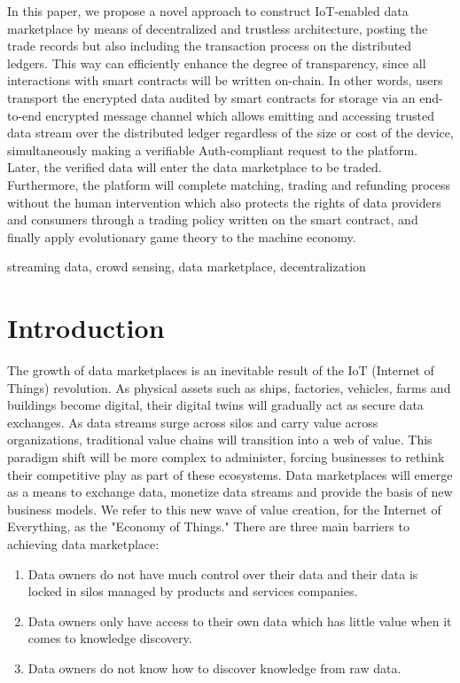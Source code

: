 \documentclass[journal,10pt,a4paper]{IEEEtran}
\begin{document}
In this paper, we propose a novel approach to construct IoT-enabled data marketplace by means of decentralized and trustless architecture, posting the trade records but also including the transaction process on the distributed ledgers. This way can efficiently enhance the degree of transparency, since all interactions with smart contracts will be written on-chain. In other words, users transport the encrypted data audited by smart contracts for storage via an end-to-end encrypted message channel which allows emitting and accessing trusted data stream over the distributed ledger regardless of the size or cost of the device, simultaneously making a verifiable Auth-compliant request to the platform. Later, the verified data will enter the data marketplace to be traded. Furthermore, the platform will complete matching, trading and refunding process without the human intervention which also protects the rights of data providers and consumers through a trading policy written on the smart contract, and finally apply evolutionary game theory to the machine economy.

\begin{IEEEkeywords}
    streaming data, crowd sensing, data marketplace, decentralization
\end{IEEEkeywords}

\section{\normalsize\textbf{Introduction}}
The growth of data marketplaces is an inevitable result of the IoT (Internet of Things) revolution. As physical assets such as ships, factories, vehicles, farms and buildings become digital, their digital twins will gradually act as secure data exchanges.\cite{digitaltwin}\cite{AutonomousDriving} As data streams surge across silos and carry value across organizations, traditional value chains will transition into a web of value. This paradigm shift will be more complex to administer, forcing businesses to rethink their competitive play as part of these ecosystems. Data marketplaces will emerge as a means to exchange data, monetize data streams and provide the basis of new business models. We refer to this new wave of value creation, for the Internet of Everything, as the "Economy of Things." There are three main barriers to achieving data marketplace:
\begin{enumerate}
    \item Data owners do not have much control over their data and their data is locked in silos managed by products and services companies.
    \item Data owners only have access to their own data which has little value when it comes to knowledge discovery.
    \item Data owners do not know how to discover knowledge from raw data.
\end{enumerate}
\end{document}
